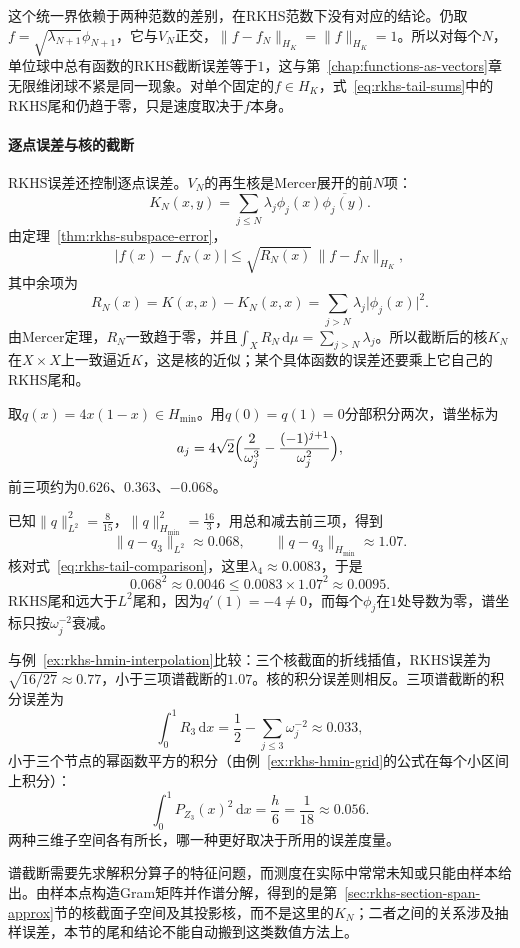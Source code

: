 这个统一界依赖于两种范数的差别，在RKHS范数下没有对应的结论。仍取$f=\sqrt{\lambda_{N+1}}\phi_{N+1}$，它与$V_N$正交，$\lVert f-f_N\rVert_{H_K}=\lVert f\rVert_{H_K}=1$。所以对每个$N$，单位球中总有函数的RKHS截断误差等于$1$，这与第~\ref{chap:functions-as-vectors}章无限维闭球不紧是同一现象。对单个固定的$f\in H_K$，式~\eqref{eq:rkhs-tail-sums}中的RKHS尾和仍趋于零，只是速度取决于$f$本身。

\paragraph{逐点误差与核的截断}

RKHS误差还控制逐点误差。$V_N$的再生核是Mercer展开的前$N$项：
\[
K_N(x,y)=\sum_{j\leq N}\lambda_j\phi_j(x)\overline{\phi_j(y)} .
\]
由定理~\ref{thm:rkhs-subspace-error}，
\[
\lvert f(x)-f_N(x)\rvert\leq\sqrt{R_N(x)}\,\lVert f-f_N\rVert_{H_K},
\]
其中余项为
\[
R_N(x)=K(x,x)-K_N(x,x)=\sum_{j>N}\lambda_j\lvert\phi_j(x)\rvert^2 .
\]
由Mercer定理，$R_N$一致趋于零，并且$\int_XR_N\,\mathrm d\mu=\sum_{j>N}\lambda_j$。所以截断后的核$K_N$在$X\times X$上一致逼近$K$，这是核的近似；某个具体函数的误差还要乘上它自己的RKHS尾和。

\begin{example}[最小值核的三项截断]
\label{ex:rkhs-hmin-truncation}
取$q(x)=4x(1-x)\in H_{\min}$。用$q(0)=q(1)=0$分部积分两次，谱坐标为
\[
a_j=4\sqrt2\Bigl(\frac{2}{\omega_j^3}-\frac{(-1)^{j+1}}{\omega_j^2}\Bigr),
\]
前三项约为$0.626$、$0.363$、$-0.068$。

已知$\lVert q\rVert_{L^2}^2=\tfrac{8}{15}$，$\lVert q\rVert_{H_{\min}}^2=\tfrac{16}{3}$，用总和减去前三项，得到
\[
\lVert q-q_3\rVert_{L^2}\approx0.068,\qquad \lVert q-q_3\rVert_{H_{\min}}\approx1.07 .
\]
核对式~\eqref{eq:rkhs-tail-comparison}，这里$\lambda_4\approx0.0083$，于是
\[
0.068^2\approx0.0046\leq0.0083\times1.07^2\approx0.0095 .
\]
RKHS尾和远大于$L^2$尾和，因为$q'(1)=-4\neq0$，而每个$\phi_j$在$1$处导数为零，谱坐标只按$\omega_j^{-2}$衰减。

与例~\ref{ex:rkhs-hmin-interpolation}比较：三个核截面的折线插值，RKHS误差为$\sqrt{16/27}\approx0.77$，小于三项谱截断的$1.07$。核的积分误差则相反。三项谱截断的积分误差为
\[
\int_0^1R_3\,\mathrm dx=\frac12-\sum_{j\leq3}\omega_j^{-2}\approx0.033 ,
\]
小于三个节点的幂函数平方的积分（由例~\ref{ex:rkhs-hmin-grid}的公式在每个小区间上积分）：
\[
\int_0^1P_{Z_3}(x)^2\,\mathrm dx=\frac h6=\frac1{18}\approx0.056 .
\]两种三维子空间各有所长，哪一种更好取决于所用的误差度量。
\end{example}

谱截断需要先求解积分算子的特征问题，而测度在实际中常常未知或只能由样本给出。由样本点构造Gram矩阵并作谱分解，得到的是第~\ref{sec:rkhs-section-span-approx}节的核截面子空间及其投影核，而不是这里的$K_N$；二者之间的关系涉及抽样误差，本节的尾和结论不能自动搬到这类数值方法上。
